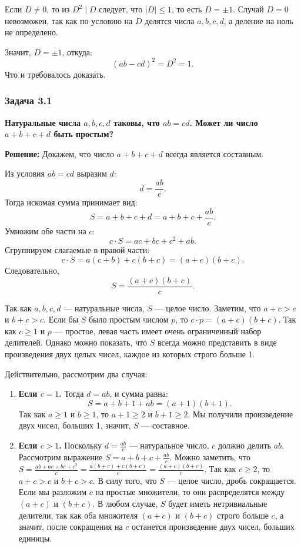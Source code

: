 \documentclass[12pt, a4paper]{article}
\begin{document}
Если $D \neq 0$, то из $D^2 \mid D$ следует, что \(|D| \le 1\), то есть $D = \pm 1$. 
Случай $D = 0$ невозможен, так как по условию на $D$ делятся числа $a, b, c, d$, а деление на ноль не определено.

Значит, $D = \pm 1$, откуда:
\[
(ab - cd)^2 = D^2 = 1.
\]
Что и требовалось доказать.

\subsubsection*{Задача 3.1}
\textbf{Натуральные числа $a, b, c, d$ таковы, что $ab = cd$. Может ли число $a + b + c + d$ быть простым?}

\textbf{Решение:}
Докажем, что число $a + b + c + d$ всегда является составным.

Из условия $ab = cd$ выразим $d$:
\[
d = \frac{ab}{c}.
\]
Тогда искомая сумма принимает вид:
\[
S = a + b + c + d = a + b + c + \frac{ab}{c}.
\]
Умножим обе части на $c$:
\[
c \cdot S = ac + bc + c^2 + ab.
\]
Сгруппируем слагаемые в правой части:
\[
c \cdot S = a(c + b) + c(b + c) = (a + c)(b + c).
\]
Следовательно,
\[
S = \frac{(a + c)(b + c)}{c}.
\]

Так как $a, b, c, d$ — натуральные числа, $S$ — целое число. Заметим, что $a+c > c$ и $b+c > c$. 
Если бы $S$ было простым числом $p$, то $c \cdot p = (a+c)(b+c)$. 
Так как $c \ge 1$ и $p$ — простое, левая часть имеет очень ограниченный набор делителей. Однако можно показать, что $S$ всегда можно представить в виде произведения двух целых чисел, каждое из которых строго больше 1.

Действительно, рассмотрим два случая:
\begin{enumerate}
    \item \textbf{Если $c = 1$.} Тогда $d = ab$, и сумма равна:
    \[
    S = a + b + 1 + ab = (a + 1)(b + 1).
    \]
    Так как $a \ge 1$ и $b \ge 1$, то $a+1 \ge 2$ и $b+1 \ge 2$. Мы получили произведение двух чисел, больших 1, значит, $S$ — составное.

    \item \textbf{Если $c > 1$.} 
    Поскольку $d = \frac{ab}{c}$ — натуральное число, $c$ должно делить $ab$. 
    Рассмотрим выражение $S = a + b + c + \frac{ab}{c}$. 
    Можно заметить, что $S = \frac{ab + ac + bc + c^2}{c} = \frac{a(b+c) + c(b+c)}{c} = \frac{(a+c)(b+c)}{c}$.
    Так как $c \ge 2$, то $a+c > c$ и $b+c > c$. 
    В силу того, что $S$ — целое число, дробь сокращается. 
    Если мы разложим $c$ на простые множители, то они распределятся между $(a+c)$ и $(b+c)$. 
    В любом случае, $S$ будет иметь нетривиальные делители, так как оба множителя $(a+c)$ и $(b+c)$ строго больше $c$, а значит, после сокращения на $c$ останется произведение двух чисел, больших единицы.
\end{enumerate}
\end{document}
